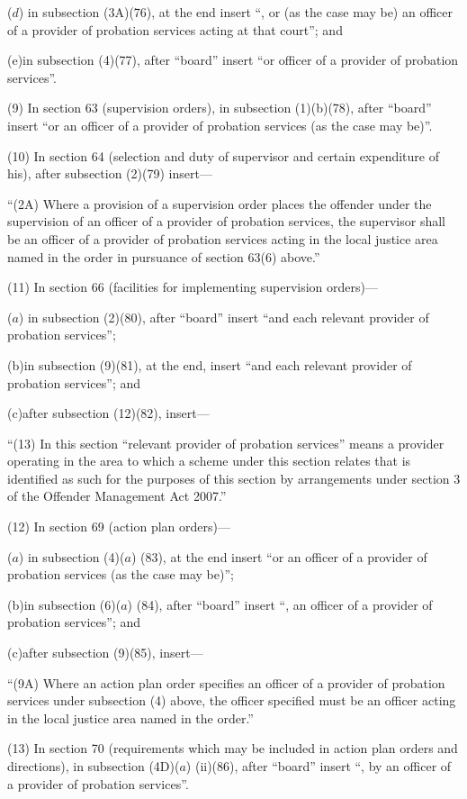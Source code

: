 \documentclass[12pt,a4paper]{article}
\begin{document}
($d$) in subsection (3A)(76), at the end insert “, or (as the case may be) an officer of a provider of probation services acting at that court”; and

(e)in subsection (4)(77), after “board” insert “or officer of a provider of probation services”.

(9) In section 63 (supervision orders), in subsection (1)(b)(78), after “board” insert “or an officer of a provider of probation services (as the case may be)”.

(10) In section 64 (selection and duty of supervisor and certain expenditure of his), after subsection (2)(79) insert—

“(2A) Where a provision of a supervision order places the offender under the supervision of an officer of a provider of probation services, the supervisor shall be an officer of a provider of probation services acting in the local justice area named in the order in pursuance of section 63(6) above.”

(11) In section 66 (facilities for implementing supervision orders)—

($a$) in subsection (2)(80), after “board” insert “and each relevant provider of probation services”;

(b)in subsection (9)(81), at the end, insert “and each relevant provider of probation services”; and

(c)after subsection (12)(82), insert—

“(13) In this section “relevant provider of probation services” means a provider operating in the area to which a scheme under this section relates that is identified as such for the purposes of this section by arrangements under section 3 of the Offender Management Act 2007.”

(12) In section 69 (action plan orders)—

($a$) in subsection (4)($a$) (83), at the end insert “or an officer of a provider of probation services (as the case may be)”;

(b)in subsection (6)($a$) (84), after “board” insert “, an officer of a provider of probation services”; and

(c)after subsection (9)(85), insert—

“(9A) Where an action plan order specifies an officer of a provider of probation services under subsection (4) above, the officer specified must be an officer acting in the local justice area named in the order.”

(13) In section 70 (requirements which may be included in action plan orders and directions), in subsection (4D)($a$) (ii)(86), after “board” insert “, by an officer of a provider of probation services”.
\end{document}

